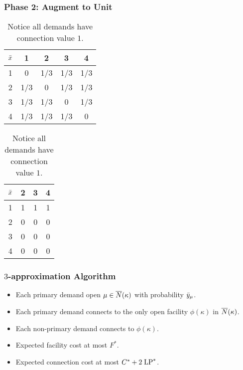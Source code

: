 \documentclass[hyperref, xcolor=dvipsnames]{beamer}
\begin{document}
\begin{frame}
  \frametitle{Phase 2: Augment to Unit}
  \begin{table}
    \begin{subtable}{0.5\textwidth}
      \centering
      \begin{tabular}{c | c c c c}
        ${\bar x}$ & 1 & 2 & 3 & 4\\
        \hline
        1 & 0 & 1/3 & 1/3 & 1/3\\
        2 & 1/3 & 0 & 1/3 & 1/3\\
        3 & 1/3 & 1/3 & 0 & 1/3\\
        4 & 1/3 & 1/3 & 1/3 & 0\\
      \end{tabular}
    \end{subtable}
%
    \begin{subtable}{0.5\textwidth}
      \centering
      \begin{tabular}{c | c c c}
        ${\bar x}$ & 2 & 3 & 4\\
        \hline
        1  & 1 & 1 & 1\\
        2  & 0 & 0 & 0\\
        3  & 0 & 0 & 0\\
        4  & 0 & 0 & 0\\
      \end{tabular}
    \end{subtable}
    \caption{Notice all demands have connection value $1$.}
  \end{table}
\end{frame}

\begin{frame}
  \frametitle{$3$-approximation Algorithm}
  \begin{itemize}
  \item Each primary demand open $\mu\in {\overline{N}}(\kappa)$ with probability
    ${\bar y}_{\mu}$.
  \item Each primary demand connects to the only open facility
    $\phi(\kappa)$ in ${\overline{N}}(\kappa)$.
  \item Each non-primary demand connects to $\phi(\kappa)$.
  \item Expected facility cost at most $F^\ast$.
  \item Expected connection cost at most $C^\ast + 2\;\mbox{\rm LP}^\ast$.
  \end{itemize}
\end{frame}
\end{document}
